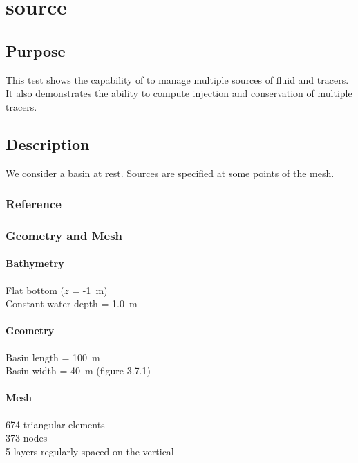 \chapter{source}
%
%
\section{Purpose}
%
This test shows the capability of  to manage multiple
sources of fluid and tracers.
It also demonstrates the ability to compute injection and conservation
of multiple tracers.
%
\section{Description}
%
We consider a basin at rest.
Sources are specified at some points of the mesh.
%
%
%
%
\subsection{Reference}
%

%
%
%
\subsection{Geometry and Mesh}
%
\subsubsection{Bathymetry}
%
Flat bottom ($z$ = -1~m)\\
Constant water depth = 1.0~m
%
\subsubsection{Geometry}
%
Basin length = 100~m\\
Basin width = 40~m (figure 3.7.1)
%
\subsubsection{Mesh}
%
674 triangular elements\\
373 nodes\\
5 layers regularly spaced on the vertical
%
%
%

